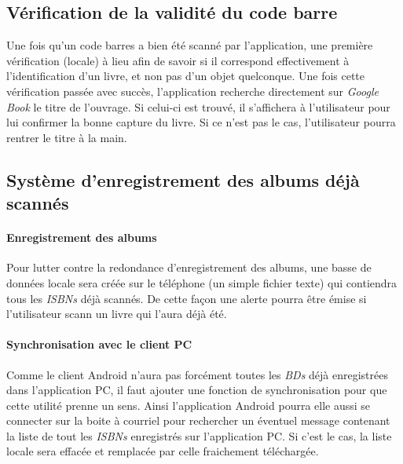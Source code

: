 \subsection{Vérification de la validité du code barre}
Une fois qu'un code barres a bien été scanné par l'application, 
	 une première vérification (locale) à lieu afin de savoir si il correspond effectivement à l'identification d'un livre, et non pas d'un objet quelconque. 
Une fois cette vérification passée avec succès, l'application recherche directement sur \emph{Google Book} le titre de l'ouvrage. Si celui-ci est trouvé, il s'affichera à l'utilisateur pour lui confirmer la bonne capture du livre. 
Si ce n'est pas le cas, l'utilisateur pourra rentrer le titre à la main. 

\subsection{Système d'enregistrement des albums déjà scannés}

\paragraph{Enregistrement des albums}
Pour lutter contre la redondance d'enregistrement des albums, une basse de données locale sera créée sur le téléphone (un simple fichier texte) qui contiendra tous les \emph{ISBNs} déjà scannés. 
De cette façon une alerte pourra être émise si l'utilisateur scann un livre qui l'aura déjà été. 

\paragraph{Synchronisation avec le client PC}
Comme le client Android n'aura pas forcément toutes les \emph{BDs} déjà enregistrées dans l'application PC, 
il faut ajouter une fonction de synchronisation pour que cette utilité prenne un sens.
Ainsi l'application Android pourra elle aussi se connecter sur la boite à courriel pour rechercher un éventuel message contenant la liste de tout les \emph{ISBNs} enregistrés sur l'application PC. 
Si c'est le cas, la liste locale sera effacée et remplacée par celle fraichement téléchargée.

